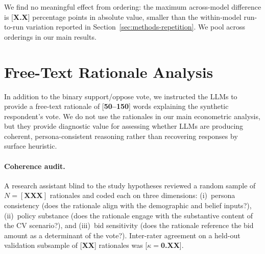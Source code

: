 \documentclass[12pt]{article}
\begin{document}
We find no meaningful effect from ordering: the maximum across-model difference is [\textbf{X.X}] percentage points in absolute value, smaller than the within-model run-to-run variation reported in Section~\ref{sec:methods-repetition}. We pool across orderings in our main results.

\section{Free-Text Rationale Analysis}\label{app:rationale-analysis}

In addition to the binary support/oppose vote, we instructed the LLMs to provide a free-text rationale of [\textbf{50--150}] words explaining the synthetic respondent's vote. We do not use the rationales in our main econometric analysis, but they provide diagnostic value for assessing whether LLMs are producing coherent, persona-consistent reasoning rather than recovering responses by surface heuristic.

\paragraph{Coherence audit.} A research assistant blind to the study hypotheses reviewed a random sample of $N = [\textbf{XXX}]$ rationales and coded each on three dimensions: (i)~persona consistency (does the rationale align with the demographic and belief inputs?), (ii)~policy substance (does the rationale engage with the substantive content of the CV scenario?), and (iii)~bid sensitivity (does the rationale reference the bid amount as a determinant of the vote?). Inter-rater agreement on a held-out validation subsample of [\textbf{XX}] rationales was [$\kappa = $\textbf{0.XX}].
\end{document}
